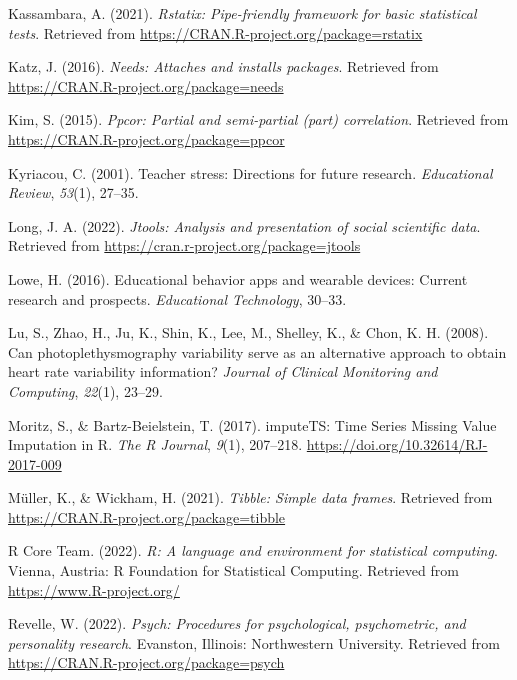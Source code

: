 \documentclass[
  man,floatsintext]{apa6}
\newlength{\cslhangindent}
\newlength{\cslentryspacingunit} %
\newenvironment{CSLReferences}[2] %
 {%
  \setlength{\parindent}{0pt}
  \ifodd #1
  \let\oldpar\par
  \def\par{\hangindent=\cslhangindent\oldpar}
  \fi
  \setlength{\parskip}{#2\cslentryspacingunit}
 }%
 {}
\begin{document}
\begin{CSLReferences}{1}{0}
\leavevmode{}%
Kassambara, A. (2021). \emph{Rstatix: Pipe-friendly framework for basic statistical tests}. Retrieved from \url{https://CRAN.R-project.org/package=rstatix}

\leavevmode{}%
Katz, J. (2016). \emph{Needs: Attaches and installs packages}. Retrieved from \url{https://CRAN.R-project.org/package=needs}

\leavevmode{}%
Kim, S. (2015). \emph{Ppcor: Partial and semi-partial (part) correlation}. Retrieved from \url{https://CRAN.R-project.org/package=ppcor}

\leavevmode{}%
Kyriacou, C. (2001). Teacher stress: Directions for future research. \emph{Educational Review}, \emph{53}(1), 27--35.

\leavevmode{}%
Long, J. A. (2022). \emph{Jtools: Analysis and presentation of social scientific data}. Retrieved from \url{https://cran.r-project.org/package=jtools}

\leavevmode{}%
Lowe, H. (2016). Educational behavior apps and wearable devices: Current research and prospects. \emph{Educational Technology}, 30--33.

\leavevmode{}%
Lu, S., Zhao, H., Ju, K., Shin, K., Lee, M., Shelley, K., \& Chon, K. H. (2008). Can photoplethysmography variability serve as an alternative approach to obtain heart rate variability information? \emph{Journal of Clinical Monitoring and Computing}, \emph{22}(1), 23--29.

\leavevmode{}%
Moritz, S., \& Bartz-Beielstein, T. (2017). {imputeTS: Time Series Missing Value Imputation in R}. \emph{{The R Journal}}, \emph{9}(1), 207--218. \url{https://doi.org/10.32614/RJ-2017-009}

\leavevmode{}%
Müller, K., \& Wickham, H. (2021). \emph{Tibble: Simple data frames}. Retrieved from \url{https://CRAN.R-project.org/package=tibble}

\leavevmode{}%
R Core Team. (2022). \emph{R: A language and environment for statistical computing}. Vienna, Austria: R Foundation for Statistical Computing. Retrieved from \url{https://www.R-project.org/}

\leavevmode{}%
Revelle, W. (2022). \emph{Psych: Procedures for psychological, psychometric, and personality research}. Evanston, Illinois: Northwestern University. Retrieved from \url{https://CRAN.R-project.org/package=psych}


\end{CSLReferences}
\end{document}
